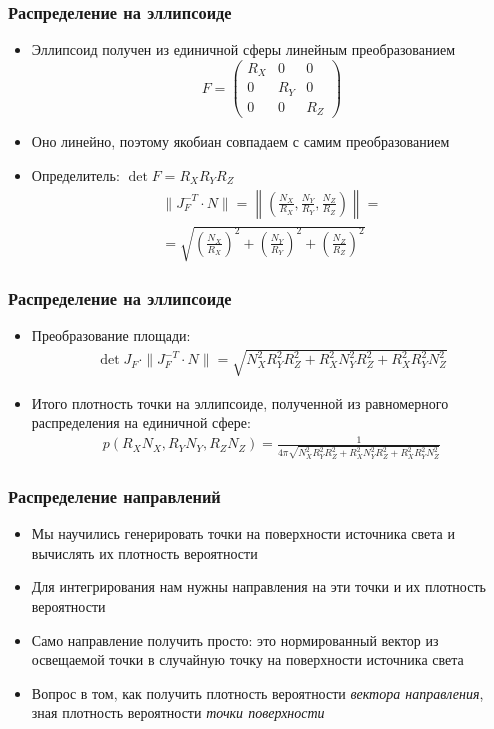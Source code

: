 \documentclass[10pt]{beamer}
\begin{document}
\begin{frame}
\frametitle{Распределение на эллипсоиде}
\begin{itemize}
\item Эллипсоид получен из единичной сферы линейным преобразованием
\begin{equation*}
F = \begin{pmatrix}
R_X & 0 & 0 \\
0 & R_Y & 0 \\
0 & 0 & R_Z 
\end{pmatrix}
\end{equation*}
\pause
\item Оно линейно, поэтому якобиан совпадаем с самим преобразованием
\pause
\item Определитель: \begin{math}\det F = R_XR_YR_Z\end{math}
\pause
\begin{gather*}
\|J_F^{-T} \cdot N\| = \left\|\left(\frac{N_X}{R_X}, \frac{N_Y}{R_Y}, \frac{N_Z}{R_Z}\right)\right\| = \\
= \sqrt{\left(\frac{N_X}{R_X}\right)^2+\left(\frac{N_Y}{R_Y}\right)^2+\left(\frac{N_Z}{R_Z}\right)^2}
\end{gather*}
\end{itemize}
\end{frame}

\begin{frame}
\frametitle{Распределение на эллипсоиде}
\begin{itemize}
\item Преобразование площади:
\begin{gather*}
\det J_F \cdot \|J_F^{-T} \cdot N\| = \sqrt{N_X^2R_Y^2R_Z^2 + R_X^2N_Y^2R_Z^2 + R_X^2R_Y^2N_Z^2}
\end{gather*}
\pause
\item Итого плотность точки на эллипсоиде, полученной из равномерного распределения на единичной сфере:
\begin{gather*}
p(R_XN_X,R_YN_Y,R_ZN_Z) = \frac{1}{4\pi\sqrt{N_X^2R_Y^2R_Z^2 + R_X^2N_Y^2R_Z^2 + R_X^2R_Y^2N_Z^2}}
\end{gather*}
\end{itemize}
\end{frame}

\begin{frame}
\frametitle{Распределение направлений}
\begin{itemize}
\item Мы научились генерировать точки на поверхности источника света и вычислять их плотность вероятности
\pause
\item Для интегрирования нам нужны направления на эти точки и их плотность вероятности
\pause
\item Само направление получить просто: это нормированный вектор из освещаемой точки в случайную точку на поверхности источника света
\pause
\item Вопрос в том, как получить плотность вероятности \textit{вектора направления}, зная плотность вероятности \textit{точки поверхности}
\end{itemize}
\end{frame}
\end{document}
